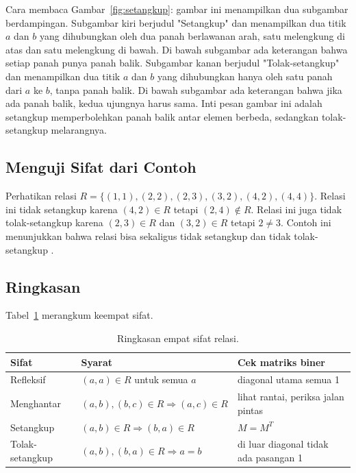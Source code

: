 \documentclass[11pt,a4paper]{article}
\begin{document}
Cara membaca Gambar~\ref{fig:setangkup}: gambar ini menampilkan dua subgambar berdampingan. Subgambar kiri berjudul "Setangkup" dan menampilkan dua titik $a$ dan $b$ yang dihubungkan oleh dua panah berlawanan arah, satu melengkung di atas dan satu melengkung di bawah. Di bawah subgambar ada keterangan bahwa setiap panah punya panah balik. Subgambar kanan berjudul "Tolak-setangkup" dan menampilkan dua titik $a$ dan $b$ yang dihubungkan hanya oleh satu panah dari $a$ ke $b$, tanpa panah balik. Di bawah subgambar ada keterangan bahwa jika ada panah balik, kedua ujungnya harus sama. Inti pesan gambar ini adalah setangkup memperbolehkan panah balik antar elemen berbeda, sedangkan tolak-setangkup melarangnya.

\subsection{Menguji Sifat dari Contoh}

Perhatikan relasi $R=\{(1,1),(2,2),(2,3),(3,2),(4,2),(4,4)\}$. Relasi ini tidak setangkup karena $(4,2) \in R$ tetapi $(2,4) \notin R$. Relasi ini juga tidak tolak-setangkup karena $(2,3) \in R$ dan $(3,2) \in R$ tetapi $2 \ne 3$. Contoh ini menunjukkan bahwa relasi bisa sekaligus tidak setangkup dan tidak tolak-setangkup \cite{rosen}.

\subsection{Ringkasan}

Tabel~\ref{tab:sifat} merangkum keempat sifat.

\begin{table}[H]
	\centering
	\caption{Ringkasan empat sifat relasi.}
	\label{tab:sifat}
	\small
	\begin{tabularx}{\textwidth}{l X X}
		\toprule
		Sifat           & Syarat                                      & Cek matriks biner                     \\
		\midrule
		Refleksif       & $(a,a) \in R$ untuk semua $a$               & diagonal utama semua 1                \\
		Menghantar      & $(a,b),(b,c) \in R \Rightarrow (a,c) \in R$ & lihat rantai, periksa jalan pintas    \\
		Setangkup       & $(a,b) \in R \Rightarrow (b,a) \in R$       & $M=M^T$                               \\
		Tolak-setangkup & $(a,b),(b,a) \in R \Rightarrow a=b$         & di luar diagonal tidak ada pasangan 1 \\
		\bottomrule
	\end{tabularx}
\end{table}
\end{document}
